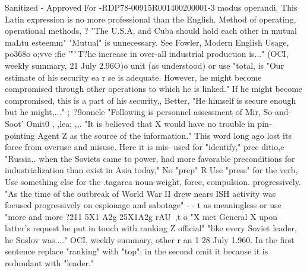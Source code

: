 \documentclass[
    oneside,
    11pt,
    draft
]{memoir}
\begin{document}
Sanitized - Approved For -RDP78-00915R001400200001-3 modus operandi. This Latin expression is no more professional than the English. Method of operating, operational methods, ? "The U.S.A. and Cuba should hold each other in mutual maLtu esteemm" "Mutual" is unnecessary. See Fowler, Modern English Usage, po368o o;vve ;fie '"`T?he increase in over-all industrial production is..." (OCI, weekly summary, 21 July 2.96O)o unit (as understood) or use "total, is "Our estimate of his security ea r se is adequate. However, he might become compromised through other operations to which he is linked." If he might become compromised, this is a part of his security,, Better, "He himself is secure enough but he might,..." ;~?9onnele "Following is personnel assessment of Mir, So-and-Soot' Omit0 , ,lea; ,,. "It is believed that X would have no trouble in pin- pointing Agent Z as the source of the information." This word long ago lost its force from overuse and misuse. Here it is mis- used for "identify," prec ditio,e "Russia.. when the Soviets came to power, had more favorable preconditions for industrialization than exist in Asia today," No "prep" R Use "press" for the verb, Use something else for the .tagarea noun-weight, force, compulsion. progressively. "As the time of the outbreak of World War II drew nears ISH activity was focused progressively on espionage and sabotage" - - t as meaningless or use "more and more ?211 5X1 A2g 25X1A2g rAU~,t o "X met General X upon latter's request be put in touch with ranking Z official" "like every Soviet leader, he Suslov was...." OCI, weekly summary, other r an 1 28 July 1.960. In the first sentence replace "ranking" with "top"; in the second omit it because it is redundant with "leader."
\end{document}
